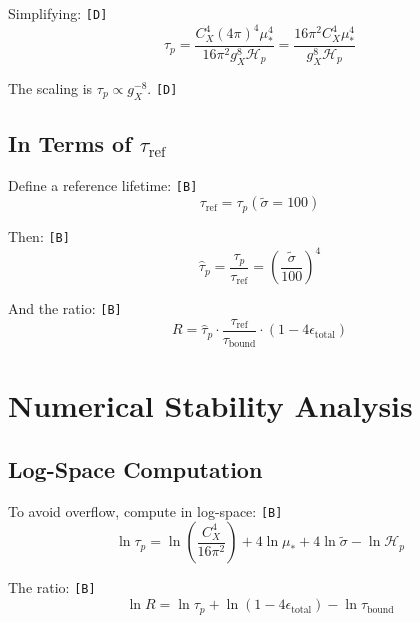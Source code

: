 \documentclass[11pt,a4paper]{article}
\newcommand{\tagD}{\textcolor{green!50!black}{\texttt{[D]}}}
\newcommand{\tagB}{\textcolor{purple!70!black}{\texttt{[B]}}}
\theoremstyle{definition}
\begin{document}
Simplifying: \tagD{}
\begin{equation}
\label{eq:gx-tau-simp}
\tau_p = \frac{C_X^4 (4\pi)^4 \mu_*^4}{16\pi^2 g_X^8 \mathcal{H}_p} = \frac{16\pi^2 C_X^4 \mu_*^4}{g_X^8 \mathcal{H}_p}
\end{equation}

The scaling is $\tau_p \propto g_X^{-8}$. \tagD{}

\subsection{In Terms of $\tau_{\text{ref}}$}
\label{subsec:ref-param}

Define a reference lifetime: \tagB{}
\begin{equation}
\label{eq:tau-ref-def}
\tau_{\text{ref}} = \tau_p(\tilde{\sigma} = 100)
\end{equation}

Then: \tagB{}
\begin{equation}
\label{eq:tau-normalized}
\hat{\tau}_p = \frac{\tau_p}{\tau_{\text{ref}}} = \left(\frac{\tilde{\sigma}}{100}\right)^4
\end{equation}

And the ratio: \tagB{}
\begin{equation}
\label{eq:ratio-normalized}
R = \hat{\tau}_p \cdot \frac{\tau_{\text{ref}}}{\tau_{\text{bound}}} \cdot (1 - 4\epsilon_{\text{total}})
\end{equation}

\section{Numerical Stability Analysis}
\label{sec:numerical}

\subsection{Log-Space Computation}
\label{subsec:log-space}

To avoid overflow, compute in log-space: \tagB{}
\begin{equation}
\label{eq:log-tau}
\ln\tau_p = \ln\left(\frac{C_X^4}{16\pi^2}\right) + 4\ln\mu_* + 4\ln\tilde{\sigma} - \ln\mathcal{H}_p
\end{equation}

The ratio: \tagB{}
\begin{equation}
\label{eq:log-ratio}
\ln R = \ln\tau_p + \ln(1 - 4\epsilon_{\text{total}}) - \ln\tau_{\text{bound}}
\end{equation}
\end{document}
